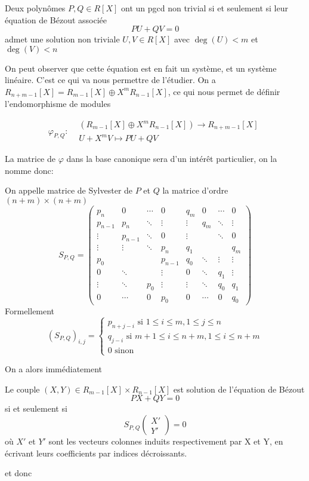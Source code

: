 \documentclass{article}
\begin{document}
\begin{proposition}
Deux polynômes $P, Q \in R[X]$ ont un pgcd non trivial si et seulement si leur équation de Bézout associée 
$$PU + QV = 0$$
admet une solution non triviale $U, V \in R[X]$ avec $\deg(U) < m$ et $\deg(V) < n$
\end{proposition}

On peut observer que cette équation est en fait un système, et un système linéaire. C'est ce qui va nous permettre de l'étudier. 
On a $R_{n+m-1}[X] = R_{m-1}[X] \oplus X^mR_{n-1}[X]$, ce qui nous permet de définir l'endomorphisme de modules

$$\varphi_{P, Q}: \begin{array}{rcl}
&(R_{m-1}[X] \oplus X^mR_{n-1}[X]) \to R_{n+m-1}[X]\\
&U + X^mV \mapsto PU + QV
\end{array}$$

La matrice de $\varphi$ dans la base canonique sera d'un intérêt particulier, on la nomme donc:

\begin{definition}
On appelle matrice de Sylvester de $P$ et $Q$ la matrice d'ordre $(n+m) \times (n+m)$
$$ S_{P, Q} =
\begin{pmatrix}
p_{n}&0&\cdots &0&q_{m}&0&\cdots &0\\
p_{n-1}&p_{n}&\ddots &\vdots &\vdots &q_{m}&\ddots &\vdots \\
\vdots &p_{n-1}&\ddots &0&\vdots &&\ddots &0\\
\vdots &\vdots &\ddots &p_{n}&q_{1}&&&q_{m}\\
p_{0}&&&p_{n-1}&q_{0}&\ddots &\vdots &\vdots \\
0&\ddots &&\vdots &0&\ddots &q_{1}&\vdots \\
\vdots &\ddots &p_{0}&\vdots &\vdots &\ddots &q_{0}&q_{1}\\
0&\cdots &0&p_{0}&0&\cdots &0&q_{0}
\end{pmatrix}$$
Formellement 
$$(S_{P, Q})_{i, j} = 
\begin{cases}
p_{n+j-i} \textrm{ si } 1 \leq i \leq m, 1 \leq j \leq n \\
q_{j-i} \textrm{ si } m+1 \leq i \leq n+m, 1 \leq i \leq n + m\\
0 \textrm{ sinon}
\end{cases}$$
\end{definition}

On a alors immédiatement

\begin{proposition}
Le couple $(X, Y) \in R_{m-1}[X] \times R_{n-1}[X]$ est solution de l'équation de Bézout 
$$PX + QY = 0$$
si et seulement si
$$S_{P, Q}\begin{pmatrix}X' \\ Y' \end{pmatrix} = 0$$
où $X'$ et $Y'$ sont les vecteurs colonnes induits respectivement par X et Y, en écrivant leurs coefficients par indices décroissants.
\end{proposition}
et donc
\end{document}
